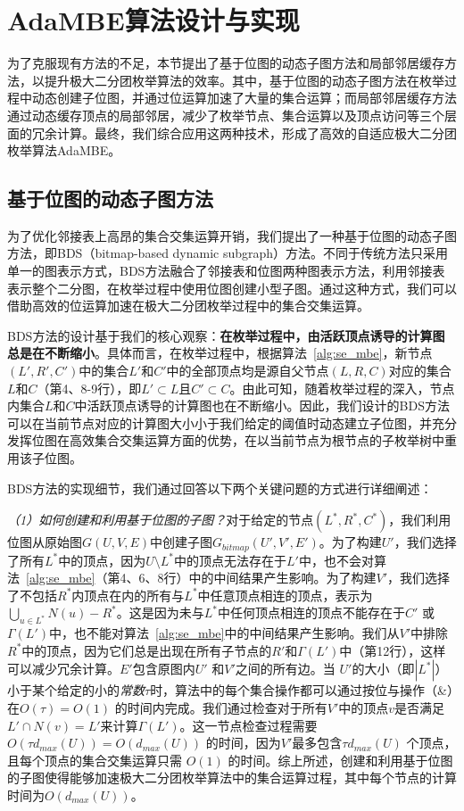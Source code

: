 \section{AdaMBE算法设计与实现}

为了克服现有方法的不足，本节提出了基于位图的动态子图方法和局部邻居缓存方法，以提升极大二分团枚举算法的效率。其中，基于位图的动态子图方法在枚举过程中动态创建子位图，并通过位运算加速了大量的集合运算；而局部邻居缓存方法通过动态缓存顶点的局部邻居，减少了枚举节点、集合运算以及顶点访问等三个层面的冗余计算。最终，我们综合应用这两种技术，形成了高效的自适应极大二分团枚举算法AdaMBE。

\subsection{基于位图的动态子图方法}
\label{subsec:ada_design_1}

为了优化邻接表上高昂的集合交集运算开销，我们提出了一种基于位图的动态子图方法，即BDS（bitmap-based dynamic subgraph）方法。不同于传统方法只采用单一的图表示方式，BDS方法融合了邻接表和位图两种图表示方法，利用邻接表表示整个二分图，在枚举过程中使用位图创建小型子图。通过这种方式，我们可以借助高效的位运算加速在极大二分团枚举过程中的集合交集运算。

BDS方法的设计基于我们的核心观察：\textbf{在枚举过程中，由活跃顶点诱导的计算图总是在不断缩小}。具体而言，在枚举过程中，根据算法~\ref{alg:se_mbe}，新节点$(L',R',C')$中的集合$L'$和$C'$中的全部顶点均是源自父节点$(L, R, C)$对应的集合$L$和$C$（第4、8-9行），即$L'\subset L$且$C'\subset C$。由此可知，随着枚举过程的深入，节点内集合$L$和$C$中活跃顶点诱导的计算图也在不断缩小。因此，我们设计的BDS方法可以在当前节点对应的计算图大小小于我们给定的阈值时动态建立子位图，并充分发挥位图在高效集合交集运算方面的优势，在以当前节点为根节点的子枚举树中重用该子位图。

BDS方法的实现细节，我们通过回答以下两个关键问题的方式进行详细阐述：

\textit{（1）如何创建和利用基于位图的子图？}对于给定的节点$(L^*, R^*, C^*)$，我们利用位图从原始图$G(U, V, E)$中创建子图$G_{bitmap}(U',V',E')$。为了构建$U'$，我们选择了所有$L^*$中的顶点，因为$U \setminus L^*$中的顶点无法存在于$L'$中，也不会对算法~\ref{alg:se_mbe}（第4、6、8行）中的中间结果产生影响。为了构建$V'$，我们选择了不包括$R^*$内顶点在内的所有与$L^*$中任意顶点相连的顶点，表示为$\bigcup_{u \in L^*}N(u) - R^*$。这是因为未与$L^*$中任何顶点相连的顶点不能存在于$C'$ 或 $\Gamma(L')$中，也不能对算法~\ref{alg:se_mbe}中的中间结果产生影响。我们从$V'$中排除$R^*$中的顶点，因为它们总是出现在所有子节点的$R'$和$\Gamma(L')$中（第12行），这样可以减少冗余计算。$E'$包含原图内$U'$ 和$V'$之间的所有边。当 $U'$的大小（即$|L^*|$）小于某个给定的小的\emph{常数$\tau$}时，算法中的每个集合操作都可以通过按位与操作（\&）在$O(\tau) = O(1)$ 的时间内完成。我们通过检查对于所有$V'$中的顶点$v$是否满足$L' \cap N(v) = L'$来计算$\Gamma(L')$。这一节点检查过程需要$O(\tau d_{max}(U))=O(d_{max}(U))$ 的时间，因为$V'$最多包含$\tau d_{max}(U)$ 个顶点，且每个顶点的集合交集运算只需 $O(1)$ 的时间。综上所述，创建和利用基于位图的子图使得能够加速极大二分团枚举算法中的集合运算过程，其中每个节点的计算时间为$O(d_{max}(U))$。

